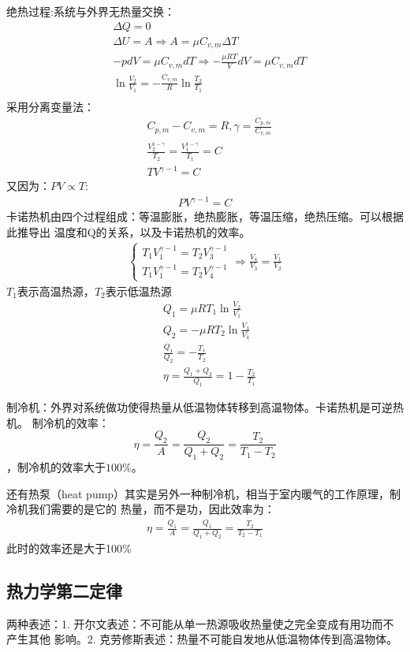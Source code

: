 \documentclass[UTF8]{article}
\numberwithin{equation}{section}
\begin{document}
绝热过程:系统与外界无热量交换：
\begin{align*}
    &\Delta Q=0\\
    &\Delta U=A \Rightarrow A = \mu C_{v,m}\Delta T\\
    &-pdV = \mu C_{v,m} dT\Rightarrow -\frac{\mu R T}{V}dV = \mu C_{v,m}dT\\
    &\ln \frac{V_2}{V_1}=-\frac{C_{v,m}}{R}\ln \frac{T_2}{T_1}  \\
\end{align*}
采用分离变量法：
\begin{align*}
    &C_{p,m}-C_{v,m}=R,\gamma = \frac{C_{p,m}}{C_{v,m}}\\
    &\frac{V_2^{1-\gamma}}{T_2}=\frac{V_1^{1-\gamma}}{T_1}=C\\
    &TV^{\gamma -1}=C
\end{align*}
又因为：$PV \propto T$:
\begin{align*}
    PV^{\gamma-1}=C  
\end{align*}
卡诺热机由四个过程组成：等温膨胀，绝热膨胀，等温压缩，绝热压缩。可以根据此推导出
温度和Q的关系，以及卡诺热机的效率。
\begin{align*}
    \begin{cases}
        T_1V_1^{\gamma-1}=T_2V_3^{\gamma-1}\\
        T_1V_1^{\gamma-1}=T_2V_4^{\gamma-1}
    \end{cases}
    \Rightarrow \frac{V_4}{V_3}=\frac{V_1}{V_2}
\end{align*}
$T_1$表示高温热源，$T_2$表示低温热源
\begin{align*}
    &Q_1=\mu RT_1\ln\frac{V_2}{V_1}\\
    &Q_2=- \mu RT_2\ln\frac{V_3}{V_4}\\
    &\frac{Q_1}{Q_2}=-\frac{T_1}{T_2}\\
    &\eta =\frac{Q_1+Q_2}{Q_1} =1-\frac{T_2}{T_1}
\end{align*}

制冷机：外界对系统做功使得热量从低温物体转移到高温物体。卡诺热机是可逆热机。
制冷机的效率：$$\eta=\frac{Q_2}{A}=\frac{Q_2}{Q_1+ Q_2}=\frac{T_2}{T_1-T_2}$$
，制冷机的效率大于$100\%$。

还有热泵（heat pump）其实是另外一种制冷机，相当于室内暖气的工作原理，制冷机我们需要的是它的
热量，而不是功，因此效率为：
\begin{align*}
    \eta = \frac{Q_1}{A}=\frac{Q_1}{Q_1+Q_2}=\frac{T_2}{T_2-T_1}
\end{align*}
此时的效率还是大于100\%
\subsection{热力学第二定律}
两种表述：1. 开尔文表述：不可能从单一热源吸收热量使之完全变成有用功而不产生其他
影响。2. 克劳修斯表述：热量不可能自发地从低温物体传到高温物体。
\end{document}

